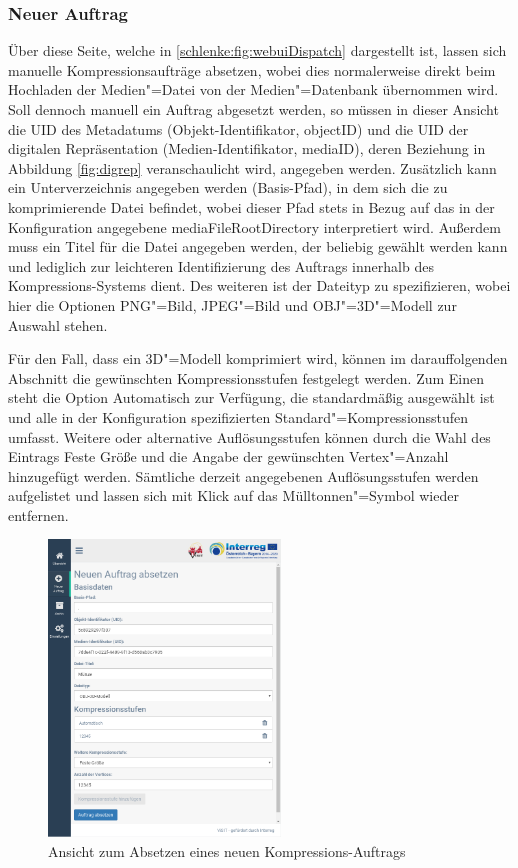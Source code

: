 \subsubsection{Neuer Auftrag}

Über diese Seite, welche in \autoref{schlenke:fig:webuiDispatch} dargestellt ist, lassen sich manuelle Kompressionsaufträge absetzen, wobei dies normalerweise direkt beim Hochladen der Medien"=Datei von der Medien"=Datenbank übernommen wird. Soll dennoch manuell ein Auftrag abgesetzt werden, so müssen in dieser Ansicht die UID des Metadatums (Objekt-Identifikator, {\ttfamily objectID}) und die UID der digitalen Repräsentation (Medien-Identifikator, {\ttfamily mediaID}), deren Beziehung in Abbildung \autoref{fig:digrep} veranschaulicht wird, angegeben werden. Zusätzlich kann ein Unterverzeichnis angegeben werden (Basis-Pfad), in dem sich die zu komprimierende Datei befindet, wobei dieser Pfad stets in Bezug auf das in der Konfiguration angegebene {\ttfamily media\-File\-Root\-Directory} interpretiert wird. Außerdem muss ein Titel für die Datei angegeben werden, der beliebig gewählt werden kann und lediglich zur leichteren Identifizierung des Auftrags innerhalb des Kompressions-Systems dient. Des weiteren ist der Dateityp zu spezifizieren, wobei hier die Optionen PNG"=Bild, JPEG"=Bild und OBJ"=3D"=Modell zur Auswahl stehen. 

Für den Fall, dass ein 3D"=Modell komprimiert wird, können im darauffolgenden Abschnitt die gewünschten Kompressionsstufen festgelegt werden. Zum Einen steht die Option \glqq{}Automatisch\grqq{} zur Verfügung, die standardmäßig ausgewählt ist und alle in der Konfiguration spezifizierten Standard"=Kompressionsstufen umfasst. Weitere oder alternative Auflösungsstufen können durch die Wahl des Eintrags \glqq{}Feste Größe\grqq{} und die Angabe der gewünschten Vertex"=Anzahl hinzugefügt werden. Sämtliche derzeit angegebenen Auflösungsstufen werden aufgelistet und lassen sich mit Klick auf das Mülltonnen"=Symbol wieder entfernen.

\begin{figure}
\begin{center}
\includegraphics[width=0.55\textwidth]{Figures/schlenker/webui/dispatch2.png}
\caption{Ansicht zum Absetzen eines neuen Kompressions-Auftrags}
\label{schlenke:fig:webuiDispatch}
\end{center}
\end{figure}

